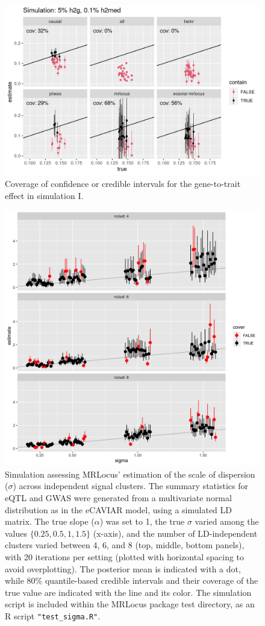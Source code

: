 \documentclass[11pt]{article}
\begin{document}
\begin{figure}[!ht]
  \centering
  \includegraphics[width=.8\textwidth]{figs/cover9.png}
  \caption{Coverage of confidence or credible intervals for the
    gene-to-trait effect in simulation I.}
\end{figure}

\begin{figure}[!ht]
  \centering
  \includegraphics[width=.7\textwidth]{figs/sigma_est.png}
  \caption{Simulation assessing MRLocus' estimation of the scale of
    dispersion ($\sigma$) across independent signal clusters. The
    summary statistics for eQTL and GWAS were generated from a
    multivariate normal distribution as in the eCAVIAR model, using a
    simulated LD matrix. The true slope ($\alpha$) was set to 1, the
    true $\sigma$ varied among the values $\{0.25, 0.5, 1, 1.5\}$
    (x-axis), and the number of LD-independent clusters varied between
    4, 6, and 8 (top, middle, bottom panels), with 20 iterations
    per setting (plotted with horizontal spacing to avoid
    overplotting).  The posterior mean is indicated with a dot, while
    80\% quantile-based credible intervals and their coverage of the
    true value are indicated with the line and its color. The
    simulation script is included within the MRLocus package test
    directory, as an R script \texttt{"test\_sigma.R"}.}
\end{figure}
\end{document}
